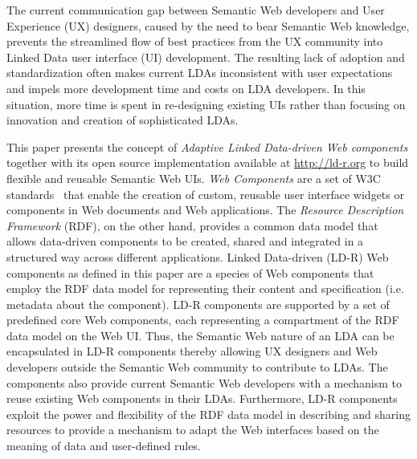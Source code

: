 \documentclass{llncs}
\begin{document}
The current communication gap between Semantic Web developers and User Experience (UX) designers, caused by the need to bear Semantic Web knowledge, prevents the streamlined flow of best practices from the UX community into Linked Data user interface (UI) development.
The resulting lack of adoption and standardization often makes current LDAs inconsistent with user expectations and impels more development time and costs on LDA developers.
In this situation, more time is spent in re-designing existing UIs rather than focusing on innovation and creation of sophisticated LDAs.

This paper presents the concept of \emph{Adaptive Linked Data-driven Web components} together with its open source implementation available at \url{http://ld-r.org} to build flexible and reusable Semantic Web UIs.
\emph{Web Components} are a set of W3C standards~\cite{webcomponentsW3C} that enable the creation of custom, reusable user interface widgets or components in Web documents and Web applications.
The \emph{Resource Description Framework} (RDF), on the other hand, provides a common data model that allows data-driven components to be created, shared and integrated in a structured way across different applications.
Linked Data-driven (LD-R) Web components as defined in this paper are a species of Web components that employ the RDF data model for representing their content and specification (i.e. metadata about the component).
LD-R components are supported by a set of predefined core Web components, each representing a compartment of the RDF data model on the Web UI.
Thus, the Semantic Web nature of an LDA can be encapsulated in LD-R components thereby allowing UX designers and Web developers outside the Semantic Web community to contribute to LDAs.
The components also provide current Semantic Web developers with a mechanism to reuse existing Web components in their LDAs.
Furthermore, LD-R components exploit the power and flexibility of the RDF data model in describing and sharing resources to provide a mechanism to adapt the Web interfaces based on the meaning of data and user-defined rules.
\end{document}
